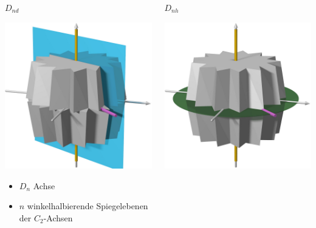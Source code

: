 \begin{frame}[t]
\begin{columns}[t,onlytextwidth]
\begin{column}{0.33\textwidth}
\begin{block}{$D_{nd}$}
\begin{center}
\includegraphics[width=\textwidth]{../slides/6/punktgruppen/images/dnd.jpg}
\end{center}
\begin{itemize}
\item $D_n$ Achse
\item $n$ winkelhalbierende Spiegelebenen der $C_2$-Achsen
\end{itemize}
\end{block}
\end{column}
\begin{column}{0.33\textwidth}
\begin{block}{$D_{nh}$}
\begin{center}
\includegraphics[width=\textwidth]{../slides/6/punktgruppen/images/dnh.jpg}

\end{center}
\end{block}
\end{column}
\end{columns}
\end{frame}
